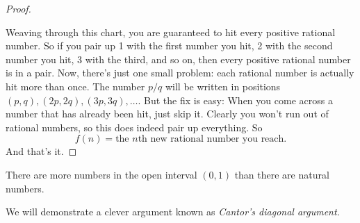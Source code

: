 \begin{proof}
\begin{tightfigure}
  \end{tightfigure}

  Weaving through this chart, you are guaranteed to hit every
  positive rational number. So if you pair up 1 with the first number
  you hit, 2 with the second number you hit, 3 with the third, and so
  on, then every positive rational number is in a pair. Now, there's
  just one small problem: each rational number is actually hit more
  than once. The number $p/q$ will be written in positions $(p, q),
  (2p, 2q), (3p, 3q), \dots$. But the fix is easy: When you come
  across a number that has already been hit, just skip it. Clearly
  you won't run out of rational numbers, so this does indeed pair up
  everything. So
  \[ f(n) = \text{the $n$th new rational number you reach}. \]
  And that's it.
\end{proof}

\begin{theorem}
  There are more numbers in the open interval $(0, 1)$ than there are
  natural numbers.
\end{theorem}

We will demonstrate a clever argument known as \textit{Cantor's
diagonal argument}.

